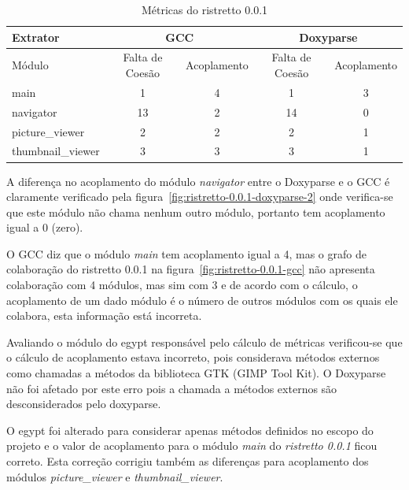 \begin{table}
\caption{Métricas do ristretto 0.0.1}
\centering
\begin{tabular}{| l | c c | c c |}
\hline
Extrator          & \multicolumn{2}{|c|}{GCC}        & \multicolumn{2}{|c|}{Doxyparse} \\
\hline
Módulo            & Falta de Coesão & Acoplamento    & Falta de Coesão & Acoplamento   \\
\hline
main              & 1               & 4              & 1               & 3             \\
navigator         & 13              & 2              & 14              & 0             \\
picture\_viewer   & 2               & 2              & 2               & 1             \\
thumbnail\_viewer & 3               & 3              & 3               & 1             \\
\hline
\end{tabular}
\label{tab:comparacao-metricas-ristretto-0.0.1}
\end{table}

A diferença no acoplamento do módulo {\it navigator} entre o Doxyparse e o GCC
é claramente verificado pela figura~\ref{fig:ristretto-0.0.1-doxyparse-2} onde
verifica-se que este módulo não chama nenhum outro módulo, portanto tem
acoplamento igual a 0 (zero).

O GCC diz que o módulo {\it main} tem acoplamento igual a 4, mas o grafo de
colaboração do ristretto 0.0.1 na figura~\ref{fig:ristretto-0.0.1-gcc} não
apresenta colaboração com 4 módulos, mas sim com 3 e de acordo com o cálculo, o
acoplamento de um dado módulo é o número de outros módulos com os quais ele
colabora, esta informação está incorreta.

Avaliando o módulo do egypt responsável pelo cálculo de métricas verificou-se
que o cálculo de acoplamento estava incorreto, pois considerava métodos externos
como chamadas a métodos da biblioteca GTK (GIMP Tool Kit). O Doxyparse não foi afetado por este erro pois a chamada a
métodos externos são desconsiderados pelo doxyparse.

O egypt foi alterado para considerar apenas métodos definidos no escopo do
projeto e o valor de acoplamento para o módulo {\it main} do {\it ristretto
0.0.1} ficou correto. Esta correção corrigiu também as diferenças para
acoplamento dos módulos {\it picture\_viewer} e {\it thumbnail\_viewer}.

